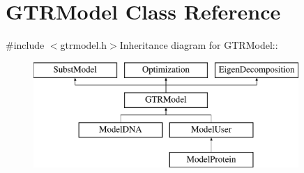 \hypertarget{classGTRModel}{
\section{GTRModel Class Reference}
\label{classGTRModel}
}


{\ttfamily \#include $<$gtrmodel.h$>$}Inheritance diagram for GTRModel::\begin{figure}[H]
\begin{center}
\leavevmode
\includegraphics[height=4cm]{classGTRModel}
\end{center}
\end{figure}
